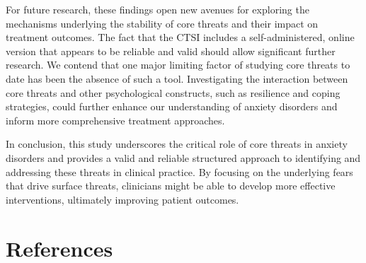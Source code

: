 \documentclass[
  man,floatsintext]{apa7}
\begin{document}
For future research, these findings open new avenues for exploring the mechanisms underlying the stability of core threats and their impact on treatment outcomes.
The fact that the CTSI includes a self-administered, online version that appears to be reliable and valid should allow significant further research.
We contend that one major limiting factor of studying core threats to date has been the absence of such a tool.
Investigating the interaction between core threats and other psychological constructs, such as resilience and coping strategies, could further enhance our understanding of anxiety disorders and inform more comprehensive treatment approaches.

In conclusion, this study underscores the critical role of core threats in anxiety disorders and provides a valid and reliable structured approach to identifying and addressing these threats in clinical practice.
By focusing on the underlying fears that drive surface threats, clinicians might be able to develop more effective interventions, ultimately improving patient outcomes.

\newpage

\section{References}\label{references}
\end{document}
